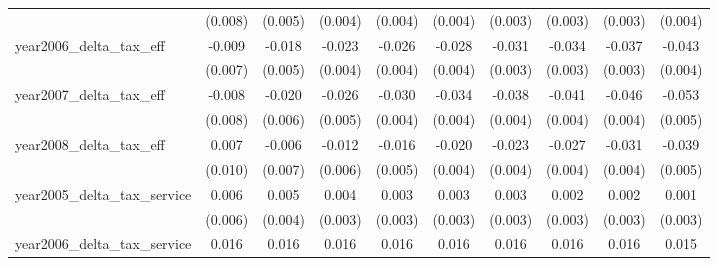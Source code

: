 {\begin{tabular}{l*{9}{c}}
            &     (0.008)         &     (0.005)         &     (0.004)         &     (0.004)         &     (0.004)         &     (0.003)         &     (0.003)         &     (0.003)         &     (0.004)         \\
[1em]
year2006_delta_tax_eff&      -0.009         &      -0.018\sym{***}&      -0.023\sym{***}&      -0.026\sym{***}&      -0.028\sym{***}&      -0.031\sym{***}&      -0.034\sym{***}&      -0.037\sym{***}&      -0.043\sym{***}\\
            &     (0.007)         &     (0.005)         &     (0.004)         &     (0.004)         &     (0.004)         &     (0.003)         &     (0.003)         &     (0.003)         &     (0.004)         \\
[1em]
year2007_delta_tax_eff&      -0.008         &      -0.020\sym{***}&      -0.026\sym{***}&      -0.030\sym{***}&      -0.034\sym{***}&      -0.038\sym{***}&      -0.041\sym{***}&      -0.046\sym{***}&      -0.053\sym{***}\\
            &     (0.008)         &     (0.006)         &     (0.005)         &     (0.004)         &     (0.004)         &     (0.004)         &     (0.004)         &     (0.004)         &     (0.005)         \\
[1em]
year2008_delta_tax_eff&       0.007         &      -0.006         &      -0.012\sym{**} &      -0.016\sym{***}&      -0.020\sym{***}&      -0.023\sym{***}&      -0.027\sym{***}&      -0.031\sym{***}&      -0.039\sym{***}\\
            &     (0.010)         &     (0.007)         &     (0.006)         &     (0.005)         &     (0.004)         &     (0.004)         &     (0.004)         &     (0.004)         &     (0.005)         \\
[1em]
year2005_delta_tax_service&       0.006         &       0.005         &       0.004         &       0.003         &       0.003         &       0.003         &       0.002         &       0.002         &       0.001         \\
            &     (0.006)         &     (0.004)         &     (0.003)         &     (0.003)         &     (0.003)         &     (0.003)         &     (0.003)         &     (0.003)         &     (0.003)         \\
[1em]
year2006_delta_tax_service&       0.016\sym{**} &       0.016\sym{***}&       0.016\sym{***}&       0.016\sym{***}&       0.016\sym{***}&       0.016\sym{***}&       0.016\sym{***}&       0.016\sym{***}&       0.015\sym{***}\\

\end{tabular}}
